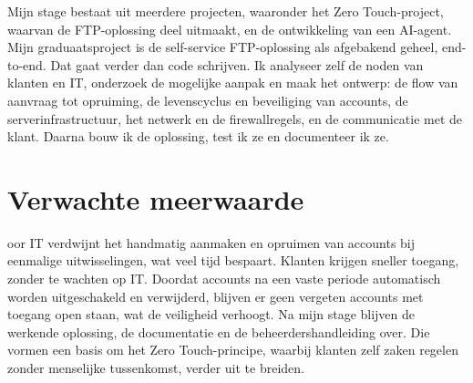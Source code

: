 Mijn stage bestaat uit meerdere projecten, waaronder het Zero Touch-project, waarvan de FTP-oplossing deel uitmaakt, en de ontwikkeling van een AI-agent. Mijn graduaatsproject is de self-service FTP-oplossing als afgebakend geheel, end-to-end. Dat gaat verder dan code schrijven. Ik analyseer zelf de noden van klanten en IT, onderzoek de mogelijke aanpak en maak het ontwerp: de flow van aanvraag tot opruiming, de levenscyclus en beveiliging van accounts, de serverinfrastructuur, het netwerk en de firewallregels, en de communicatie met de klant. Daarna bouw ik de oplossing, test ik ze en documenteer ik ze.


\section{Verwachte meerwaarde}%
\label{vst:meerwaarde}


oor IT verdwijnt het handmatig aanmaken en opruimen van accounts bij eenmalige uitwisselingen, wat veel tijd bespaart. Klanten krijgen sneller toegang, zonder te wachten op IT. Doordat accounts na een vaste periode automatisch worden uitgeschakeld en verwijderd, blijven er geen vergeten accounts met toegang open staan, wat de veiligheid verhoogt. Na mijn stage blijven de werkende oplossing, de documentatie en de beheerdershandleiding over. Die vormen een basis om het Zero Touch-principe, waarbij klanten zelf zaken regelen zonder menselijke tussenkomst, verder uit te breiden.



